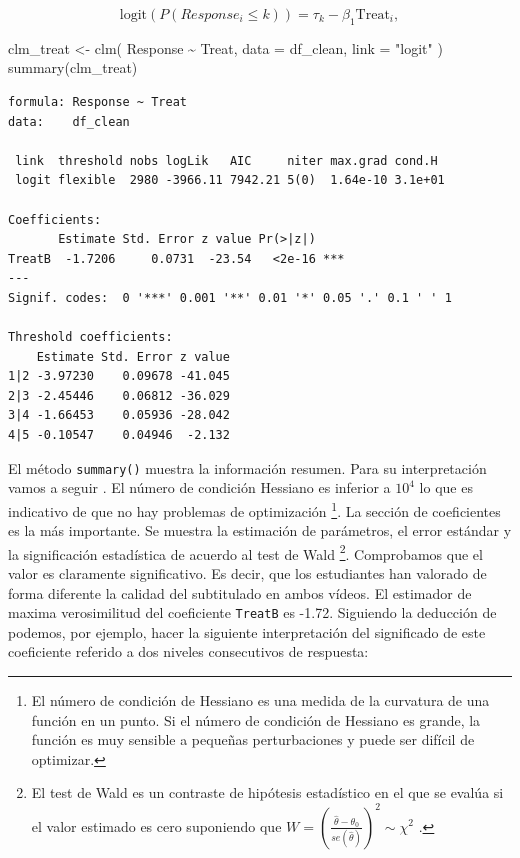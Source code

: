 \documentclass[
  12pt,
  a4paper,
  extrafontsizes,
  onecolumn,
  openright]{memoir}
\newenvironment{Shaded}{\begin{snugshade}}{\end{snugshade}}
\newcommand{\AttributeTok}[1]{\textcolor[rgb]{0.40,0.45,0.13}{#1}}
\newcommand{\FunctionTok}[1]{\textcolor[rgb]{0.28,0.35,0.67}{#1}}
\newcommand{\NormalTok}[1]{\textcolor[rgb]{0.00,0.23,0.31}{#1}}
\newcommand{\OtherTok}[1]{\textcolor[rgb]{0.00,0.23,0.31}{#1}}
\newcommand{\SpecialCharTok}[1]{\textcolor[rgb]{0.37,0.37,0.37}{#1}}
\newcommand{\StringTok}[1]{\textcolor[rgb]{0.13,0.47,0.30}{#1}}
\begin{document}
\[
\text{logit}(P(Response_i \leq k)) = \tau_k - \beta_1 \text{Treat}_i,
\]

\scriptsize

\begin{Shaded}
\begin{Highlighting}[]
\NormalTok{clm\_treat }\OtherTok{\textless{}{-}}
    \FunctionTok{clm}\NormalTok{(}
\NormalTok{        Response }\SpecialCharTok{\textasciitilde{}}\NormalTok{ Treat,}
        \AttributeTok{data =}\NormalTok{ df\_clean, }\AttributeTok{link =} \StringTok{"logit"}
\NormalTok{    )}
\FunctionTok{summary}\NormalTok{(clm\_treat)}
\end{Highlighting}
\end{Shaded}

\begin{verbatim}
formula: Response ~ Treat
data:    df_clean

 link  threshold nobs logLik   AIC     niter max.grad cond.H 
 logit flexible  2980 -3966.11 7942.21 5(0)  1.64e-10 3.1e+01

Coefficients:
       Estimate Std. Error z value Pr(>|z|)    
TreatB  -1.7206     0.0731  -23.54   <2e-16 ***
---
Signif. codes:  0 '***' 0.001 '**' 0.01 '*' 0.05 '.' 0.1 ' ' 1

Threshold coefficients:
    Estimate Std. Error z value
1|2 -3.97230    0.09678 -41.045
2|3 -2.45446    0.06812 -36.029
3|4 -1.66453    0.05936 -28.042
4|5 -0.10547    0.04946  -2.132
\end{verbatim}

\normalsize

El método \texttt{summary()} muestra la información resumen. Para su
interpretación vamos a seguir \textcite{christensen2018CumulativeLM}. El
número de condición Hessiano es inferior a \(10^4\) lo que es indicativo
de que no hay problemas de optimización \footnote{El número de condición
  de Hessiano es una medida de la curvatura de una función en un punto.
  Si el número de condición de Hessiano es grande, la función es muy
  sensible a pequeñas perturbaciones y puede ser difícil de optimizar.}.
La sección de coeficientes es la más importante. Se muestra la
estimación de parámetros, el error estándar y la significación
estadística de acuerdo al test de Wald \footnote{El test de Wald es un
  contraste de hipótesis estadístico en el que se evalúa si el valor
  estimado es cero suponiendo que
  \(W = \left(\frac{\hat{\theta} - \theta_0}{se(\hat{\theta})}\right)^2 \sim \chi^{2}\)
  .}. Comprobamos que el valor es claramente significativo. Es decir,
que los estudiantes han valorado de forma diferente la calidad del
subtitulado en ambos vídeos. El estimador de maxima verosimilitud del
coeficiente \texttt{TreatB} es -1.72. Siguiendo la deducción de
\textcite{bruin2011} podemos, por ejemplo, hacer la siguiente
interpretación del significado de este coeficiente referido a dos
niveles consecutivos de respuesta:
\end{document}
